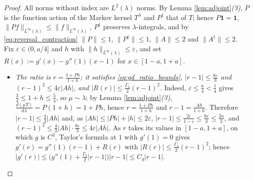 \begin{proof}
All norms without index are $L^2(\lambda)$ norms. By Lemma \ref{lem:adjoint}\emph{(3)}, $P$ is the function action of the Markov kernel $T^\lambda$ and $P^\dagger$ that of $T$; hence $P\mathbf 1=\mathbf 1$, $\|Pf\|_{L^\infty(\lambda)}\leq\|f\|_{L^\infty(\lambda)}$, $P^\dagger$ preserves $\lambda$-integrals, and by \eqref{eq:reversal_contraction} $\|P\|\leq1$, $\|P^\dagger\|\leq1$, $\|A\|\leq2$ and $\|A^\dagger\|\leq2$. Fix $\varepsilon\in(0,a/4]$ and $h$ with $\|h\|_{L^\infty(\lambda)}\leq\varepsilon$, and set $R(x):=g'(x)-g''(1)(x-1)$ for $x\in[1-a,1+a]$.
\begin{itemize}
    \item \emph{The ratio is $r=\frac{1+Ph}{1+h}$; it satisfies \eqref{eq:gd_ratio_bounds}, $|r-1|\leq\frac{8\varepsilon}3$ and $(r-1)^2\leq4\varepsilon|Ah|$, and $|R(r)|\leq\frac{\Gamma_3}2(r-1)^2$.} Indeed, $\varepsilon\leq\frac a4<\frac14$ gives $\frac34\leq1+h\leq\frac54$, so $\mu\sim\lambda$; by Lemma \ref{lem:adjoint}\emph{(3)}, $\frac{d(\mu T)}{d\lambda}=P(1+h)=1+Ph$, hence $r=\frac{1+Ph}{1+h}$ and $r-1=\frac{Ah}{1+h}$. Therefore $|r-1|\leq\frac43|Ah|$ and, as $|Ah|\leq|Ph|+|h|\leq2\varepsilon$, $|r-1|\leq\frac{2\varepsilon}{1-\varepsilon}\leq\frac{8\varepsilon}3\leq\frac{2a}3$, and $(r-1)^2\leq\frac43|Ah|\cdot\frac{8\varepsilon}3\leq4\varepsilon|Ah|$. As $r$ takes its values in $[1-a,1+a]$, on which $g$ is $C^3$, Taylor's formula at $1$ with $g'(1)=0$ gives $g'(r)=g''(1)(r-1)+R(r)$ with $|R(r)|\leq\frac{\Gamma_3}2(r-1)^2$; hence $|g'(r)|\leq\bigl(g''(1)+\frac{\Gamma_3}2|r-1|\bigr)|r-1|\leq C_g|r-1|$.

\end{itemize}
\end{proof}
